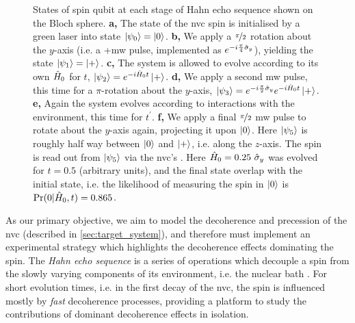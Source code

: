 \begin{figure}
\begin{center}
{        }
        \qquad
    \end{center}
    \caption[States of spin qubit at each stage of Hahn echo sequence shown on the Bloch sphere]{
        States of spin qubit at each stage of Hahn echo sequence shown on the Bloch sphere.
        \textbf{a,} The state of the \gls{nvc} spin is initialised by a green laser into state $\ket{\psi_0} = \ket{0}$. 
        \textbf{b,} We apply a $\nicefrac{\pi}{2}$ rotation about the $y$-axis (i.e. a \glsxtrfull+{mw} pulse, implemented as $e^{-i \frac{\pi}{4} \hat{\sigma}_y}$), 
            yielding the state $\ket{\psi_1} = \ket{+}$. 
        \textbf{c,} The system is allowed to evolve according to its own $\hat{H}_0$ for $t$, $\ket{\psi_2} = e^{-i\hat{H}_0 t}\ket{+}$.
        \textbf{d,} We apply a second \gls{mw} pulse, this time for a $\pi$-rotation about the $y$-axis, 
        $\ket{\psi_3} = e^{-i\frac{\pi}{2} \hat{\sigma}_y}e^{-i\hat{H}_0 t}\ket{+}$.
        \textbf{e,} Again the system evolves according to interactions with the environment, this time for $t^{\prime}$.
        \textbf{f,} We apply a final $\nicefrac{\pi}{2}$ \gls{mw} pulse to rotate about the $y$-axis again, 
            projecting it upon $\ket{0}$.
        Here $\ket{\psi_5}$ is roughly half way between $\ket{0}$ and $\ket{+}$, 
        i.e. along the $z$-axis. 
        The spin is read out from $\ket{\psi_5}$ via the \gls{nvc}'s . 
        Here $\hat{H}_0 = 0.25 \ \hat{\sigma}_y$ was evolved for $t=0.5$ (arbitrary units), 
        and the final state overlap with the initial state, 
        i.e. the \gls{likelihood} of measuring the spin in $\ket{0}$ is $\Pr(0 | \hat{H}_0, t) = 0.865$. 
    }
    \label{fig:hahn_bloch_spheres}
\end{figure}

As our primary objective, we aim to model the decoherence and precession of the \gls{nvc} (described in \cref{sec:target_system}), 
    and therefore must implement an experimental strategy which highlights 
    the decoherence effects dominating the spin. 
The \emph{Hahn echo sequence} is a series of operations which decouple a spin from the  
    slowly varying components of its environment, i.e. the nuclear bath
    \cite{blok2014manipulating, childress2006coherent, rowan1965electron, charnock2001combined, gentile2020Operating}.
For short evolution times, i.e. in the first decay of the \gls{nvc}, the spin is influenced mostly by \emph{fast} decoherence processes,
    providing a platform to study the contributions of dominant decoherence effects in isolation. 


